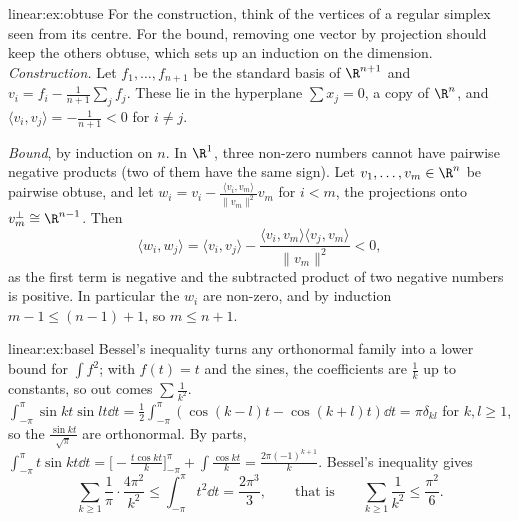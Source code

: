 \begin{solution}{linear:ex:obtuse}
\idea For the construction, think of the vertices of a regular simplex seen from its centre. For the bound, removing
one vector by projection should keep the others obtuse, which sets up an induction on the dimension.
\writeup \emph{Construction.} Let $f_1,\dots,f_{n+1}$ be the standard basis of $\R^{n+1}$ and $v_i=f_i-\frac1{n+1}
\sum_jf_j$. These lie in the hyperplane $\sum x_j=0$, a copy of $\R^n$, and $\langle v_i,v_j\rangle=-\frac1{n+1}<0$ for
$i\ne j$.

\emph{Bound}, by induction on $n$. In $\R^1$, three non-zero numbers cannot have pairwise negative products (two of them
have the same sign). Let $v_1,\dots,v_m\in\R^n$ be pairwise obtuse, and let $w_i=v_i-\frac{\langle v_i,v_m\rangle}
{\|v_m\|^2}v_m$ for $i<m$, the projections onto $v_m^\perp\cong\R^{n-1}$. Then
\[
\langle w_i,w_j\rangle=\langle v_i,v_j\rangle-\frac{\langle v_i,v_m\rangle\langle v_j,v_m\rangle}{\|v_m\|^2}<0,
\]
as the first term is negative and the subtracted product of two negative numbers is positive. In particular the $w_i$
are non-zero, and by induction $m-1\le(n-1)+1$, so $m\le n+1$.
\end{solution}

\begin{solution}{linear:ex:basel}
\idea Bessel's inequality turns any orthonormal family into a lower bound for $\int f^2$; with $f(t)=t$ and the sines,
the coefficients are $\frac1k$ up to constants, so out comes $\sum\frac1{k^2}$.
\writeup $\int_{-\pi}^\pi\sin kt\sin lt\dd t=\frac12\int_{-\pi}^\pi(\cos(k-l)t-\cos(k+l)t)\dd t=\pi\delta_{kl}$ for $k,l\ge1$,
so the $\frac{\sin kt}{\sqrt\pi}$ are orthonormal. By parts, $\int_{-\pi}^\pi t\sin kt\dd t=\bigl[-\frac{t\cos kt}k\bigr]
_{-\pi}^\pi+\int\frac{\cos kt}k=\frac{2\pi(-1)^{k+1}}k$. Bessel's inequality gives
\[
\sum_{k\ge1}\frac1\pi\cdot\frac{4\pi^2}{k^2}\le\int_{-\pi}^\pi t^2\dd t=\frac{2\pi^3}3,\qquad\text{that is}\qquad
\sum_{k\ge1}\frac1{k^2}\le\frac{\pi^2}6.
\]
\end{solution}

